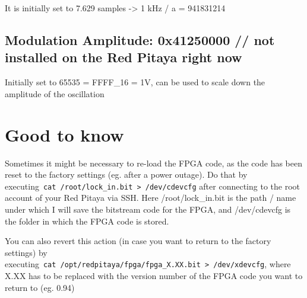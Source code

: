\documentclass[10pt]{article}
\begin{document}
\par\null

It is initially set to 7.629 samples -\textgreater{} 1 kHz / a =
941831214

\par\null

\subsection*{Modulation Amplitude: 0x41250000 // not installed on the Red
Pitaya right
now}

{\label{388808}}

Initially set to 65535 = FFFF\_16 = 1V, can be used to scale down the
amplitude of the oscillation



\section*{Good to know}

{\label{644982}}\par\null

Sometimes it might be necessary to re-load the FPGA code, as the code
has been reset to the factory settings (eg. after a power outage). Do
that by
executing~\texttt{cat\ /root/lock\_in.bit\ \textgreater{}\ /dev/cdevcfg}
after connecting to the root account of your Red Pitaya via SSH. Here
/root/lock\_in.bit is the path / name under which I will save the
bitstream code for the FPGA, and /dev/cdevcfg is the folder in which the
FPGA code is stored.

\par\null

You can also revert this action (in case you want to return to the
factory settings) by
executing~\texttt{cat\ /opt/redpitaya/fpga/fpga\_X.XX.bit\ \textgreater{}\ /dev/xdevcfg},
where X.XX has to be replaced with the version number of the FPGA code
you want to return to (eg. 0.94)

\FloatBarrier
\end{document}

